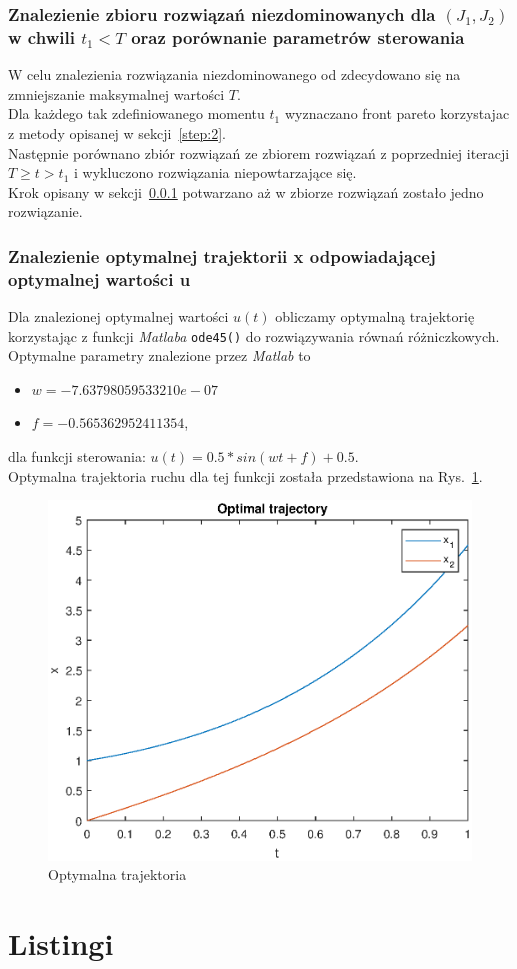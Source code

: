 \documentclass[a4paper]{article}
\begin{document}
\subsubsection{Znalezienie zbioru rozwiązań niezdominowanych dla $(J_1, J_2)$ w chwili $t_1 < T$ oraz porównanie parametrów sterowania}
\label{step:3}

W celu znalezienia rozwiązania niezdominowanego od zdecydowano się na zmniejszanie maksymalnej wartości $T$.
\\
Dla każdego tak zdefiniowanego momentu $t_1$ wyznaczano front pareto korzystajac z metody opisanej w sekcji~\ref{step:2}.
\\
Następnie porównano zbiór rozwiązań ze zbiorem rozwiązań z poprzedniej iteracji $T \geq t > t_1$ i wykluczono rozwiązania niepowtarzające się.
\\ Krok opisany w sekcji~\ref{step:3} potwarzano aż w zbiorze rozwiązań zostało jedno rozwiązanie. 

\subsubsection{Znalezienie optymalnej trajektorii x odpowiadającej optymalnej wartości u}
\label{step:4}

Dla znalezionej optymalnej wartości $u(t)$ obliczamy optymalną trajektorię korzystając z funkcji \textit{Matlaba} \texttt{ode45()} do rozwiązywania równań różniczkowych. 
\\
Optymalne parametry znalezione przez \textit{Matlab} to 
\begin{itemize}
    \item $w = -7.63798059533210e-07$
    \item $f = -0.565362952411354$,
\end{itemize}
dla funkcji sterowania: $u(t) = 0.5*sin(wt + f)+0.5$.
\\Optymalna trajektoria ruchu dla tej funkcji została przedstawiona na Rys.~\ref{fig:trajectory}.
\begin{figure}[H]
    \centering
    \includegraphics{path.eps}
    \caption{Optymalna trajektoria}
    \label{fig:trajectory}
\end{figure}

\newpage
\section{Listingi}


\end{document}
